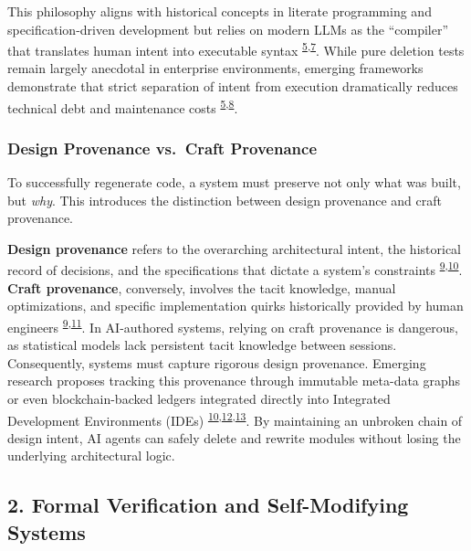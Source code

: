 \documentclass[
  11pt,
]{article}
\begin{document}
This philosophy aligns with historical concepts in literate programming
and specification-driven development but relies on modern LLMs as the
``compiler'' that translates human intent into executable syntax
\textsuperscript{\protect\hyperlink{cite-5}{5},\protect\hyperlink{cite-7}{7}}.
While pure deletion tests remain largely anecdotal in enterprise
environments, emerging frameworks demonstrate that strict separation of
intent from execution dramatically reduces technical debt and
maintenance costs
\textsuperscript{\protect\hyperlink{cite-5}{5},\protect\hyperlink{cite-8}{8}}.

\hypertarget{design-provenance-vs.-craft-provenance}{%
\subsubsection{Design Provenance vs.~Craft
Provenance}\label{design-provenance-vs.-craft-provenance}}

To successfully regenerate code, a system must preserve not only what
was built, but \emph{why}. This introduces the distinction between
design provenance and craft provenance.

\textbf{Design provenance} refers to the overarching architectural
intent, the historical record of decisions, and the specifications that
dictate a system's constraints
\textsuperscript{\protect\hyperlink{cite-9}{9},\protect\hyperlink{cite-10}{10}}.
\textbf{Craft provenance}, conversely, involves the tacit knowledge,
manual optimizations, and specific implementation quirks historically
provided by human engineers
\textsuperscript{\protect\hyperlink{cite-9}{9},\protect\hyperlink{cite-11}{11}}.
In AI-authored systems, relying on craft provenance is dangerous, as
statistical models lack persistent tacit knowledge between sessions.
Consequently, systems must capture rigorous design provenance. Emerging
research proposes tracking this provenance through immutable meta-data
graphs or even blockchain-backed ledgers integrated directly into
Integrated Development Environments (IDEs)
\textsuperscript{\protect\hyperlink{cite-10}{10},\protect\hyperlink{cite-12}{12},\protect\hyperlink{cite-13}{13}}.
By maintaining an unbroken chain of design intent, AI agents can safely
delete and rewrite modules without losing the underlying architectural
logic.

\hypertarget{formal-verification-and-self-modifying-systems}{%
\subsection{2. Formal Verification and Self-Modifying
Systems}\label{formal-verification-and-self-modifying-systems}}
\end{document}
